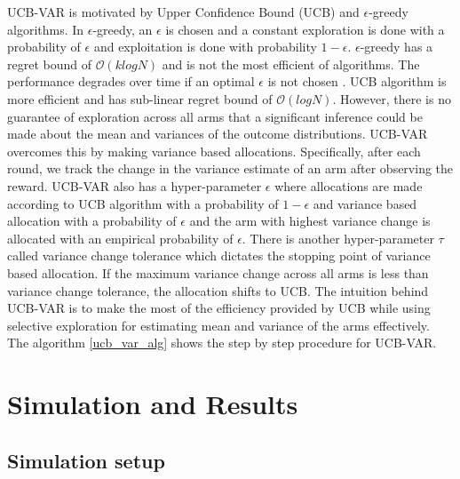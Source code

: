 \documentclass[12pt, letterpaper]{article}
\begin{document}
UCB-VAR is motivated by Upper Confidence Bound (UCB) and $\epsilon$-greedy algorithms. In $\epsilon$-greedy, an $\epsilon$ is chosen and a constant exploration is done with a probability of $\epsilon$ and exploitation is done with probability $1-\epsilon$. $\epsilon$-greedy has a regret bound of $\mathcal{O}(klogN)$ and is not the most efficient of algorithms. The performance degrades over time if an optimal $\epsilon$ is not chosen \citep{bubeck2012regret}. UCB algorithm is more efficient and has sub-linear regret bound of $\mathcal{O}(logN)$. However, there is no guarantee of exploration across all arms that a significant inference could be made about the mean and variances of the outcome distributions. UCB-VAR overcomes this by making variance based allocations. Specifically, after each round, we track the change in the variance estimate of an arm after observing the reward. UCB-VAR also has a hyper-parameter $\epsilon$ where allocations are made according to UCB algorithm with a probability of $1-\epsilon$ and variance based allocation with a probability of $\epsilon$ and the arm with highest variance change is allocated with an empirical probability of $\epsilon$. There is another hyper-parameter $\tau$ called variance change tolerance which dictates the stopping point of variance based allocation. If the maximum variance change across all arms is less than variance change tolerance, the allocation shifts to UCB. The intuition behind UCB-VAR is to make the most of the efficiency provided by UCB while using selective exploration for estimating mean and variance of the arms effectively. The algorithm \ref{ucb_var_alg} shows the step by step procedure for UCB-VAR.

\section*{Simulation and Results}

\subsection*{Simulation setup}
\end{document}
